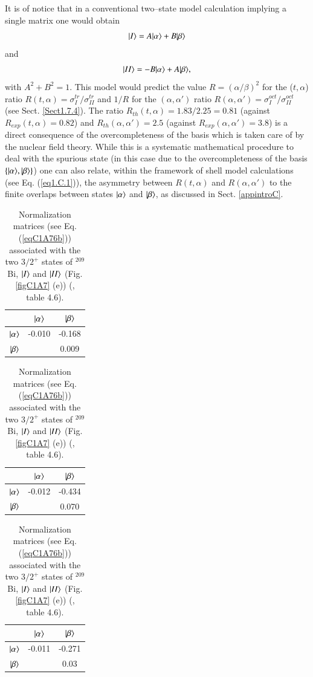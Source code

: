 \begin{subappendices}
 
 It is of notice that in a conventional two--state model calculation implying a single matrix one would obtain
 \begin{align}
\nonumber|{I} \rangle=A|{\alpha} \rangle+B|{\beta} \rangle
 \end{align}
and
 \begin{align}\label{eq1.C.6}
|{II} \rangle=-B|{\alpha} \rangle+A|{\beta} \rangle,
 \end{align}
with $A^2+B^2=1$. This model would predict the value $R=(\alpha/\beta)^2$ for the ($t,\alpha$) ratio $R(t,\alpha)=\sigma_I^{tr}/\sigma^{tr}_{II}$ and $1/R$ for the $(\alpha,\alpha')$ ratio   $R(\alpha,\alpha')=\sigma_I^{oct}/\sigma_{II}^{oct}$ (see Sect. \ref{Sect1.7.4}). The ratio $R_{th}(t,\alpha)=1.83/2.25=0.81$ (against $R_{exp}(t,\alpha)=0.82$) and $R_{th}(\alpha,\alpha')=2.5$ (against $R_{exp}(\alpha,\alpha')=3.8$) is a direct consequence of the overcompleteness of the basis which is taken care of by the nuclear field theory. While this is a systematic mathematical procedure to deal with the spurious state (in this case due to the overcompleteness of the basis $\left\{|{\alpha} \rangle,|{\beta} \rangle\right\}$) one can also relate, within the framework of shell model calculations (see Eq. (\ref{eq1.C.1})), the asymmetry between $R(t,\alpha)$ and $R(\alpha,\alpha')$ to the finite overlaps between states $|{\alpha} \rangle$ and $|{\beta} \rangle$, as discussed in Sect. \ref{appintroC}.
\begin{table}
\begin{tabular}{|c|c|c|}
 \hline 
  & $|{\alpha} \rangle$ & $|{\beta} \rangle$ \\
 \hline 
$|{\alpha} \rangle$ &-0.010 & -0.168    \\ 
 \hline
$|{\beta} \rangle$&  & 0.009 \\ 
 \hline
\end{tabular}
\begin{tabular}{|c|c|c|}
 \hline 
  & $|{\alpha} \rangle$ & $|{\beta} \rangle$ \\
 \hline 
$|{\alpha} \rangle$ &-0.012 & -0.434    \\ 
 \hline
$|{\beta} \rangle$&  & 0.070 \\ 
 \hline
\end{tabular}
\begin{tabular}{|c|c|c|}
 \hline 
  & $|{\alpha} \rangle$ & $|{\beta} \rangle$ \\
 \hline 
$|{\alpha} \rangle$ &-0.011 & -0.271    \\ 
 \hline
$|{\beta} \rangle$&  & 0.03 \\ 
 \hline
\end{tabular}\caption{Normalization matrices (see Eq. (\ref{eqC1A76b})) associated with the two $3/2^+$ states of $^{209}$Bi, $|{I} \rangle$ and $|{II} \rangle$ (Fig. \ref{figC1A7} (e)) (\cite{Bortignon:77}, table 4.6).}\label{tab1.C.1}

\end{table}
\end{subappendices}
